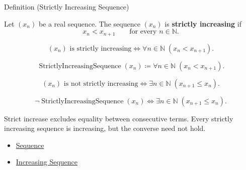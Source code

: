 
\begin{definitionbox}{Definition (Strictly Increasing Sequence)}
\begin{definition}
\label{def:strictly-increasing-sequence}
Let $(x_n)$ be a real sequence. The sequence $(x_n)$ is
\textbf{strictly increasing} if
\[
  x_n < x_{n+1}
  \qquad
  \text{for every } n\in\mathbb{N}.
\]
\end{definition}
\end{definitionbox}

\begin{remark*}
\[
(x_n)\text{ is strictly increasing}
\Longleftrightarrow
\forall n\in\mathbb{N}\;(x_n<x_{n+1}).
\]
\end{remark*}

\begin{remark*}
\[
\operatorname{StrictlyIncreasingSequence}(x_n)
\coloneqq
\forall n\in\mathbb{N}\;(x_n<x_{n+1}).
\]
\end{remark*}

\begin{remark*}
\[
(x_n)\text{ is not strictly increasing}
\Longleftrightarrow
\exists n\in\mathbb{N}\;(x_{n+1}\le x_n).
\]
\end{remark*}

\begin{remark*}
\[
\neg\operatorname{StrictlyIncreasingSequence}(x_n)
\Longleftrightarrow
\exists n\in\mathbb{N}\;(x_{n+1}\le x_n).
\]
\end{remark*}

\begin{remark*}[Interpretation]
Strict increase excludes equality between consecutive terms. Every strictly
increasing sequence is increasing, but the converse need not hold.
\end{remark*}

\begin{dependencies}
\begin{itemize}
  \item \hyperref[def:sequence]{Sequence}
  \item \hyperref[def:increasing-sequence]{Increasing Sequence}
\end{itemize}
\end{dependencies}

